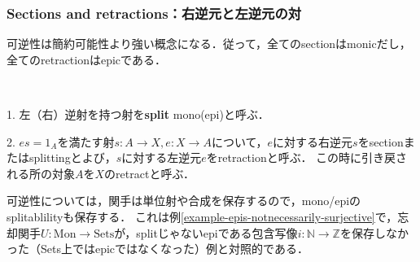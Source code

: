 \documentclass[uplatex, 12pt, dvipdfmx]{jsarticle}
\begin{document}
\clearpage

\subsubsection{Sections and retractions：右逆元と左逆元の対}
可逆性は簡約可能性より強い概念になる．従って，全てのsectionはmonicだし，全てのretractionはepicである．
\vspace{1cm}
\begin{definition}　

    1. 左（右）逆射を持つ射を\textbf{split} mono(epi)と呼ぶ．

    2. $es=1_A$を満たす射$s:A\to X, e:X\to A$について，$e$に対する右逆元$s$をsectionまたはsplittingとよび，$s$に対する左逆元$e$をretractionと呼ぶ．
    この時に引き戻される所の対象$A$を$X$のretractと呼ぶ．
    \begin{center}
    \end{center}
    \rightline{$\blacksquare$}
\end{definition}
\vspace{1cm}
\begin{remark*}
    可逆性については，関手は単位射や合成を保存するので，mono/epiのsplitablilityも保存する．
    これは例\ref{example-epis-notnecessarily-surjective}で，忘却関手$U:\mathrm{Mon}\to\mathrm{Sets}$が，splitじゃないepiである包含写像$i:\mathbb{N}\to\mathbb{Z}$を保存しなかった（Sets上ではepicではなくなった）例と対照的である．
\end{remark*}

\vspace{3cm}
\end{document}

